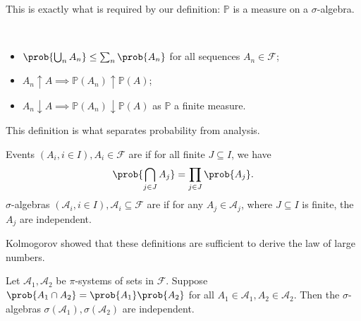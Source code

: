 This is exactly what is required by our definition: $\mathbb P$ is a measure on a $\sigma$-algebra.

\begin{remark} \
	\begin{itemize}
		\item $\prob{\bigcup_n A_n} \leq \sum_n \prob{A_n}$ for all sequences $A_n \in \mathcal{F}$;
		\item $A_n \uparrow A \implies \mathbb{P}(A_n) \uparrow \mathbb{P}(A)$;
		\item $A_n \downarrow A \implies \mathbb{P}(A_n) \downarrow \mathbb{P}(A)$ as $\mathbb{P}$ a finite measure.
	\end{itemize}
\end{remark}

This definition is what separates probability from analysis.
\begin{definition}[Independent]
	Events $(A_i, i \in I), A_i \in \mathcal{F}$ are  if for all finite $J \subseteq I$, we have
	\begin{align*}
		\prob{\bigcap_{j \in J} A_j} = \prod_{j \in J} \prob{A_j}.
	\end{align*}
	$\sigma$-algebras $(\mathcal{A}_i, i \in I), \mathcal{A}_i \subseteq \mathcal{F}$ are  if for any $A_j \in \mathcal A_j$, where $J \subseteq I$ is finite, the $A_j$ are independent.
\end{definition}

Kolmogorov showed that these definitions are sufficient to derive the law of large numbers.

\begin{proposition}
	Let $\mathcal A_1, \mathcal A_2$ be $\pi$-systems of sets in $\mathcal F$.
	Suppose $\prob{A_1 \cap A_2} = \prob{A_1} \prob{A_2}$ for all $A_1 \in \mathcal A_1, A_2 \in \mathcal A_2$.
	Then the $\sigma$-algebras $\sigma(\mathcal A_1), \sigma(\mathcal A_2)$ are independent.
\end{proposition}

